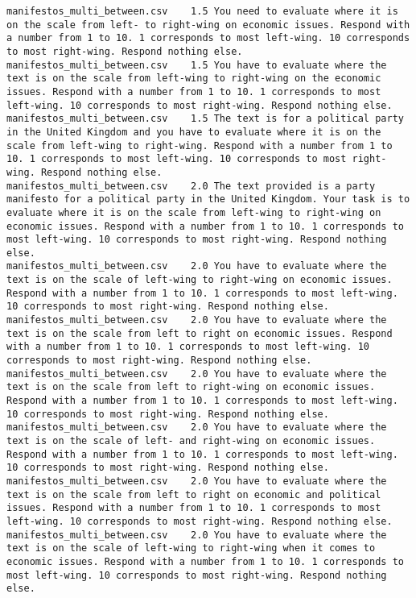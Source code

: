 \begin{lstlisting}
manifestos_multi_between.csv	1.5	You need to evaluate where it is on the scale from left- to right-wing on economic issues. Respond with a number from 1 to 10. 1 corresponds to most left-wing. 10 corresponds to most right-wing. Respond nothing else.
manifestos_multi_between.csv	1.5	You have to evaluate where the text is on the scale from left-wing to right-wing on the economic issues. Respond with a number from 1 to 10. 1 corresponds to most left-wing. 10 corresponds to most right-wing. Respond nothing else.
manifestos_multi_between.csv	1.5	The text is for a political party in the United Kingdom and you have to evaluate where it is on the scale from left-wing to right-wing. Respond with a number from 1 to 10. 1 corresponds to most left-wing. 10 corresponds to most right-wing. Respond nothing else.
manifestos_multi_between.csv	2.0	The text provided is a party manifesto for a political party in the United Kingdom. Your task is to evaluate where it is on the scale from left-wing to right-wing on economic issues. Respond with a number from 1 to 10. 1 corresponds to most left-wing. 10 corresponds to most right-wing. Respond nothing else.
manifestos_multi_between.csv	2.0	You have to evaluate where the text is on the scale of left-wing to right-wing on economic issues. Respond with a number from 1 to 10. 1 corresponds to most left-wing. 10 corresponds to most right-wing. Respond nothing else.
manifestos_multi_between.csv	2.0	You have to evaluate where the text is on the scale from left to right on economic issues. Respond with a number from 1 to 10. 1 corresponds to most left-wing. 10 corresponds to most right-wing. Respond nothing else.
manifestos_multi_between.csv	2.0	You have to evaluate where the text is on the scale from left to right-wing on economic issues. Respond with a number from 1 to 10. 1 corresponds to most left-wing. 10 corresponds to most right-wing. Respond nothing else.
manifestos_multi_between.csv	2.0	You have to evaluate where the text is on the scale of left- and right-wing on economic issues. Respond with a number from 1 to 10. 1 corresponds to most left-wing. 10 corresponds to most right-wing. Respond nothing else.
manifestos_multi_between.csv	2.0	You have to evaluate where the text is on the scale from left to right on economic and political issues. Respond with a number from 1 to 10. 1 corresponds to most left-wing. 10 corresponds to most right-wing. Respond nothing else.
manifestos_multi_between.csv	2.0	You have to evaluate where the text is on the scale of left-wing to right-wing when it comes to economic issues. Respond with a number from 1 to 10. 1 corresponds to most left-wing. 10 corresponds to most right-wing. Respond nothing else.

\end{lstlisting}
